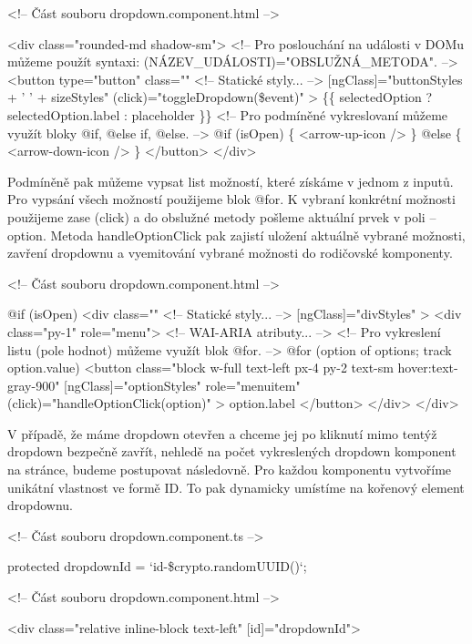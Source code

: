 \begin{prog}
<!-- Část souboru dropdown.component.html -->

<div class="rounded-md shadow-sm">
  <!-- Pro poslouchání na události v DOMu můžeme 
  použít syntaxi: (NÁZEV_UDÁLOSTI)="OBSLUŽNÁ_METODA". -->
  <button
    type="button"
    class="" <!-- Statické styly... -->
    [ngClass]="buttonStyles + ' ' + sizeStyles"
    (click)="toggleDropdown(\$event)"
  >
    \{\{ selectedOption ? selectedOption.label : placeholder \}\}
    <!-- Pro podmíněné vykreslovaní můžeme využít bloky @if, @else if, @else. -->
    @if (isOpen) \{
      <arrow-up-icon />
    \} @else \{
      <arrow-down-icon />
    \}
  </button>
</div>
\end{prog}

Podmíněně pak můžeme vypsat list možností, které získáme v jednom z inputů. Pro vypsání všech možností použijeme blok @for. 
K vybraní konkrétní možnosti použijeme zase (click) a do obslužné metody pošleme aktuální prvek v poli -- option. 
Metoda handleOptionClick pak zajistí uložení aktuálně vybrané možnosti, zavření dropdownu a vyemitování vybrané možnosti do rodičovské komponenty.

\begin{prog}
<!-- Část souboru dropdown.component.html -->

@if (isOpen) {
  <div
    class="" <!-- Statické styly... -->
    [ngClass]="divStyles"
  >
    <div class="py-1" role="menu"> <!-- WAI-ARIA atributy... -->
      <!-- Pro vykreslení listu (pole hodnot) můžeme využít blok @for. -->
      @for (option of options; track option.value) {
        <button
          class="block w-full text-left px-4 py-2 text-sm hover:text-gray-900"
          [ngClass]="optionStyles"
          role="menuitem"
          (click)="handleOptionClick(option)"
        >
          {{ option.label }}
        </button>
      }
    </div>
  </div>
}
\end{prog}

V případě, že máme dropdown otevřen a chceme jej po kliknutí mimo tentýž dropdown bezpečně zavřít, nehledě na počet vykreslených dropdown komponent na stránce, budeme postupovat následovně. 
Pro každou komponentu vytvoříme unikátní vlastnost ve formě ID. To pak dynamicky umístíme na kořenový element dropdownu.

\begin{prog}
<!-- Část souboru dropdown.component.ts -->

protected dropdownId = `id-\${crypto.randomUUID()}`;

<!-- Část souboru dropdown.component.html -->

<div class="relative inline-block text-left" [id]="dropdownId">
\end{prog}

